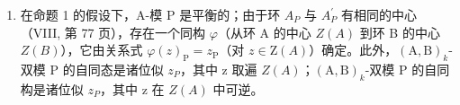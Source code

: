 \begin{enumerate}
\def\labelenumi{\arabic{enumi})}
\setcounter{enumi}{1}
\tightlist
\item
  在命题 1 的假设下，A-模 P 是平衡的；由于环 \(A_{P}\) 与 \(A_{P}^{\prime}\) 有相同的中心（VIII, 第 77 页），存在一个同构 \(\varphi\)（从环 A 的中心 \(Z(A)\) 到环 B 的中心 \(Z(B)\)），它由关系式 \(\varphi(z)_{\mathrm{P}} = z_{\mathrm{P}}\)（对 \(z \in \mathrm{Z}(A)\)）确定。此外，\((\mathrm{A}, \mathrm{B})_{k}\)-双模 P 的自同态是诸位似 \(z_{P}\)，其中 z 取遍 \(Z(A)\)；\((\mathrm{A}, \mathrm{B})_{k}\)-双模 P 的自同构是诸位似 \(z_{P}\)，其中 z 在 \(Z(A)\) 中可逆。
\end{enumerate}
\relax{}
